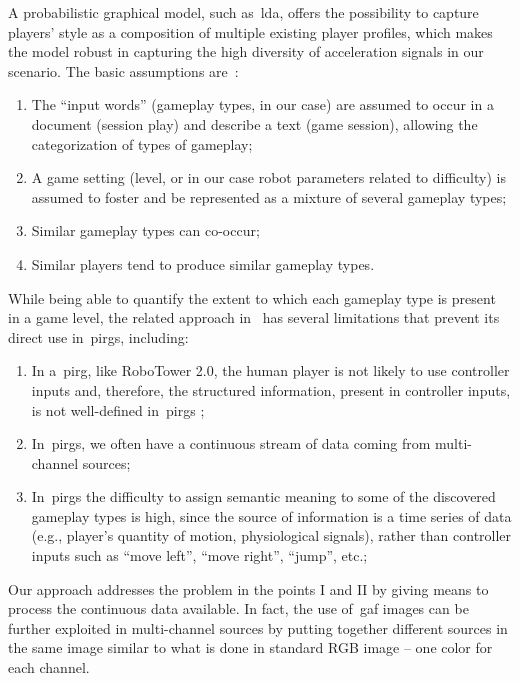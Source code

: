 A probabilistic graphical model, such as~\gls{lda}, offers the possibility to capture players' style as a composition of multiple existing player profiles, which makes the model robust in capturing the high diversity of acceleration signals in our scenario. The basic assumptions are~\citep{smith_mining_2016}:

\begin{enumerate}[label=\Alph*.]
\item The ``input words'' (gameplay types, in our case) are assumed to occur in a document (session play) and describe a text (game session), allowing the categorization of types of gameplay;
\item A game setting (level, or in our case robot parameters related to difficulty) is assumed to foster and be represented as a mixture of several gameplay types;
\item Similar gameplay types can co-occur;
\item Similar players tend to produce similar gameplay types.
\end{enumerate}

While being able to quantify the extent to which each gameplay type is present in a game level, the related approach in~\cite{smith_mining_2016} has several limitations that prevent its direct use in~\gls{pirg}s, including:

\begin{enumerate}[label=\Roman*.]
    \item In a~\gls{pirg}, like RoboTower 2.0, the human player is not likely to use controller inputs and, therefore, the structured information, present in controller inputs, is not well-defined in~\gls{pirg}s ;
    \item In~\gls{pirg}s, we often have a continuous stream of data coming from multi-channel sources;
    \item In~\gls{pirg}s the difficulty to assign semantic meaning to some of the discovered gameplay types is high, since the source of information is a time series of data (e.g., player's quantity of motion, physiological signals), rather than controller inputs such as ``move left'', ``move right'', ``jump'', etc.;

\end{enumerate}

Our approach addresses the problem in the points I and II by giving means to process the continuous data available. In fact, the use of~\gls{gaf} images can be further exploited in multi-channel sources by putting together different sources in the same image similar to what is done in standard RGB image -- one color for each channel. 


